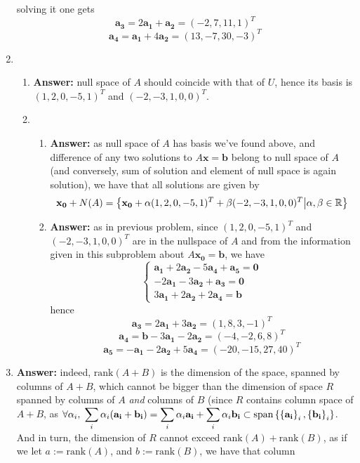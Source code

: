 \documentclass[8pt]{article} %
\begin{document}
\begin{enumerate}[1]
		solving it one gets
		\[\mathbf{a_3}=2\mathbf{a_1}+\mathbf{a_2}=(-2,7,11,1)^T\]
		\[\mathbf{a_4}=\mathbf{a_1}+4\mathbf{a_2}=(13,-7,30,-3)^T\]
	\item \begin{enumerate}[\bf(a)]
	\item {\bf Answer: }null space of $A$ should coincide with that of $U$, hence its basis is $(1,2,0,-5,1)^T$ and $(-2,-3,1,0,0)^T$.
	\item \begin{enumerate}[\bf(i)]
		\item{\bf Answer: }as null space of $A$ has basis we've found above, and difference of any two solutions to $A\mathbf{x}=\mathbf{b}$
				belong to null space of $A$ (and conversely, sum of solution and element of null space is again solution),
				we have that all solutions are given by
				\[\mathbf{x_0}+N(A)=\left\{\mathbf{x_0}+\alpha(1,2,0,-5,1)^T+\beta(-2,-3,1,0,0)^T\big| \alpha,\beta\in\mathbb{R}\right\}\]
		\item{\bf Answer: }as in previous problem, since $(1,2,0,-5,1)^T$ and $(-2,-3,1,0,0)^T$ are in the nullspace of $A$
			and from the information given in this subproblem about $A\mathbf{x_0}=\mathbf{b}$, we have
			\[\begin{cases}\mathbf{a_1}+2\mathbf{a_2}-5\mathbf{a_4}+\mathbf{a_5}=\mathbf{0}\\-2\mathbf{a_1}-3\mathbf{a_2}+\mathbf{a_3}=
				\mathbf{0}\\3\mathbf{a_1}+2\mathbf{a_2}+2\mathbf{a_4}=\mathbf{b}\end{cases}\]
			hence
			\[\mathbf{a_3}=2\mathbf{a_1}+3\mathbf{a_2}=(1,8,3,-1)^T\]
			\[\mathbf{a_4}=\mathbf{b}-3\mathbf{a_1}-2\mathbf{a_2}=(-4,-2,6,8)^T\]
			\[\mathbf{a_5}=-\mathbf{a_1}-2\mathbf{a_2}+5\mathbf{a_4}=(-20,-15,27,40)^T\]
		\end{enumerate}
	\end{enumerate}
		\setcounter{enumi}{20}
	\item {\bf Answer: }indeed, $\mbox{rank}(A+B)$ is the dimension of the space, spanned by columns of $A+B$, which
		cannot be bigger than the dimension of space $R$ spanned by columns of $A$ \textit{and} columns of $B$ (since $R$
	contains column space of $A+B$, as $\forall\alpha_i,\;\sum_i\alpha_i(\mathbf{a_i}+\mathbf{b_i})=\sum_i\alpha_i\mathbf{a_i}+
		\sum_i\alpha_i\mathbf{b_i}\subset\mbox{span}\mycbra{\mycbra{\mathbf{a_i}}_i,\mycbra{\mathbf{b_i}}_i}$. And
		in turn, the dimension of $R$ cannot exceed
		$\mbox{rank}(A)+\mbox{rank}(B)$, as if we let $a:=\mbox{rank}(A)$, and $b:=\mbox{rank}(B)$, we have that column

\end{enumerate}
\end{document}

